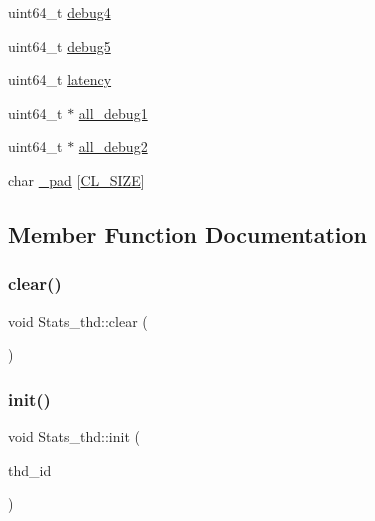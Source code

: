 \begin{DoxyCompactItemize}
\item 
uint64\+\_\+t \hyperlink{classStats__thd_a7b4e0f1509081c1c2aa3af92428cb59c}{debug4}
\item 
uint64\+\_\+t \hyperlink{classStats__thd_a8e2fee67d9f899a44a0b1b961cc42ed5}{debug5}
\item 
uint64\+\_\+t \hyperlink{classStats__thd_a2c405fcd6fcecea043a03e95517c0672}{latency}
\item 
uint64\+\_\+t $\ast$ \hyperlink{classStats__thd_ac2b8cd21ce48eee3af6246b4122ac4f5}{all\+\_\+debug1}
\item 
uint64\+\_\+t $\ast$ \hyperlink{classStats__thd_a83cd3b6b17499e33631d413204ce3dbc}{all\+\_\+debug2}
\item 
char \hyperlink{classStats__thd_a9989ab6d22c5dde64c44db70ffaaacc1}{\+\_\+pad} \mbox{[}\hyperlink{config_8h_aa18ff96566bf8c1f4cd38c1e7bc4ca80}{C\+L\+\_\+\+S\+I\+ZE}\mbox{]}
\end{DoxyCompactItemize}


\subsection{Member Function Documentation}
\mbox{\label{classStats__thd_aa76eee9ef160c0b362a893476b8ff943}} 
\subsubsection{\texorpdfstring{clear()}{clear()}}
{\footnotesize\ttfamily void Stats\+\_\+thd\+::clear (\begin{DoxyParamCaption}{ }\end{DoxyParamCaption})}

\mbox{\label{classStats__thd_ac1b482f396411d9466277b2290207871}} 
\subsubsection{\texorpdfstring{init()}{init()}}
{\footnotesize\ttfamily void Stats\+\_\+thd\+::init (\begin{DoxyParamCaption}\item[{uint64\+\_\+t}]{thd\+\_\+id }\end{DoxyParamCaption})}

